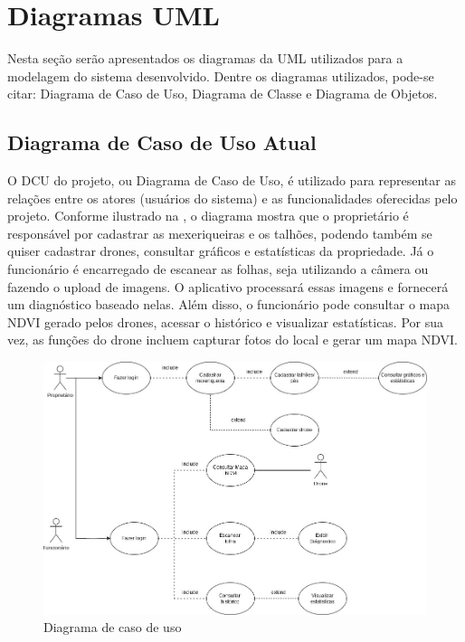 \documentclass[
  a4paper,%
  12pt,%
  english,%
  brazilian,%
]{article}
\begin{document}
\centering
\section*{Diagramas UML}
    Nesta seção serão apresentados os diagramas da UML utilizados para a modelagem do sistema desenvolvido. Dentre os diagramas utilizados, pode-se citar: Diagrama de Caso de Uso, Diagrama de Classe e Diagrama de Objetos.
    
    \subsection*{Diagrama de Caso de Uso Atual}

    O DCU do projeto, ou Diagrama de Caso de Uso, é utilizado para representar as relações entre os atores (usuários do sistema) e as funcionalidades oferecidas pelo projeto. Conforme ilustrado na , o diagrama mostra que o proprietário é responsável por cadastrar as mexeriqueiras e os talhões, podendo também se quiser cadastrar drones, consultar gráficos e estatísticas da propriedade. Já o funcionário é encarregado de escanear as folhas, seja utilizando a câmera ou fazendo o upload de imagens. O aplicativo processará essas imagens e fornecerá um diagnóstico baseado nelas. Além disso, o funcionário pode consultar o mapa NDVI gerado pelos drones, acessar o histórico e visualizar estatísticas. Por sua vez, as funções do drone incluem capturar fotos do local e gerar um mapa NDVI.

            \begin{figure}[h]
\centering
\caption{Diagrama de caso de uso}%
\label{fig:caso-uso}
\includegraphics[width=1.1\textwidth]{Logos/CasoUso.jpeg}
\end{figure}
\end{document}
